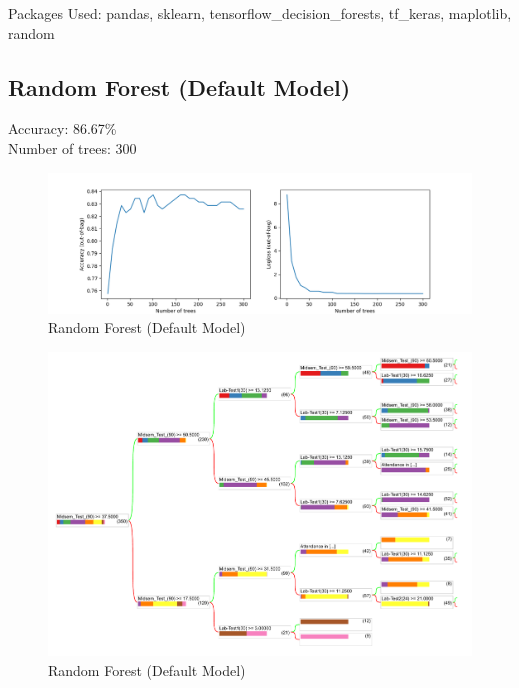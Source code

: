 \documentclass{assignmeownt}
\begin{document}
\maketitle
\thispagestyle{firststyle}

\question
Packages Used: pandas, sklearn, tensorflow\_decision\_forests, tf\_keras, maplotlib, random
\subsection{Random Forest (Default Model)}
Accuracy: 86.67\% \\
Number of trees: 300 \\
\begin{figure}[h]
    \centering
    \includegraphics[width=\textwidth]{images/defaultModelAcc.png}
    \caption{Random Forest (Default Model)}
    \label{fig:1}
\end{figure}
\begin{figure}[H]
    \centering
    \includegraphics[width=\textwidth]{images/defModel.pdf}
    \caption{Random Forest (Default Model)}
    \label{fig:5}
\end{figure}
\end{document}
